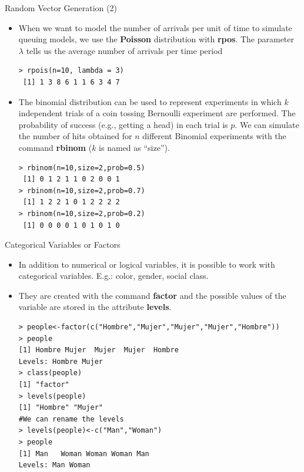 \documentclass[handout]{beamer}
\begin{document}
\begin{frame}[fragile]{Random Vector Generation (2)}
\scriptsize{
\begin{itemize}
 \item When we want to model the number of arrivals per unit of time to simulate queuing models, we use the \textbf{Poisson} distribution with \textbf{rpos}. The parameter $\lambda$ tells us the average number of arrivals per time period
 \begin{verbatim}
> rpois(n=10, lambda = 3)
 [1] 1 3 8 6 1 1 6 3 4 7
 \end{verbatim}

 \item The binomial distribution can be used to represent experiments in which $k$ independent trials of a coin tossing Bernoulli experiment are performed. The probability of success (e.g., getting a head) in each trial is $p$.  We can simulate the number of hits obtained for $n$ different Binomial experiments with the command \textbf{rbinom} ($k$ is named as ``size'').
\begin{verbatim}
> rbinom(n=10,size=2,prob=0.5)
 [1] 0 1 2 1 1 0 2 0 0 1
> rbinom(n=10,size=2,prob=0.7)
 [1] 1 2 2 1 0 1 2 2 2 2
> rbinom(n=10,size=2,prob=0.2)
 [1] 0 0 0 0 1 0 1 0 1 0 
\end{verbatim}

 
 
\end{itemize}


}
\end{frame}


\begin{frame}[fragile]{Categorical Variables or Factors}
\scriptsize{
\begin{itemize}
 \item In addition to numerical or logical variables, it is possible to work with categorical variables. E.g.: color, gender, social class.
 \item They are created with the command \textbf{factor} and the possible values of the variable are stored in the attribute \textbf{levels}.
\begin{verbatim}
> people<-factor(c("Hombre","Mujer","Mujer","Mujer","Hombre"))
> people
[1] Hombre Mujer  Mujer  Mujer  Hombre
Levels: Hombre Mujer
> class(people)
[1] "factor"
> levels(people)
[1] "Hombre" "Mujer" 
#We can rename the levels
> levels(people)<-c("Man","Woman")
> people
[1] Man   Woman Woman Woman Man  
Levels: Man Woman
\end{verbatim}
 
\end{itemize}

}
\end{frame}
\end{document}

